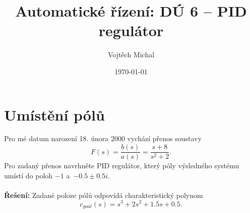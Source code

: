 \documentclass[twoside]{article}
\title{Automatické řízení: DÚ 6 -- PID regulátor}
\author{Vojtěch Michal}
\date{\today}
\begin{document}
\maketitle

\section{Umístění pólů}

Pro mé datum narození 18. února 2000 vychází přenos soustavy
\begin{equation}
	F(s) = \frac{b(s)}{a(s)} = \frac{s+8} {s^2 + 2}.
\end{equation}
Pro zadaný přenos navrhněte PID regulátor, který póly výsledného systému umístí
do poloh $-1$ a~$-0.5 \pm 0.5 i$. \\
\\
\textbf{Řešení:}
Zadané poloze pólů odpovídá charakteristický polynom
\begin{equation}
	c_{goal}(s) = s^3 + 2s^2 + 1.5 s + 0.5.
	\label{eq:goal}
\end{equation}
\end{document}
